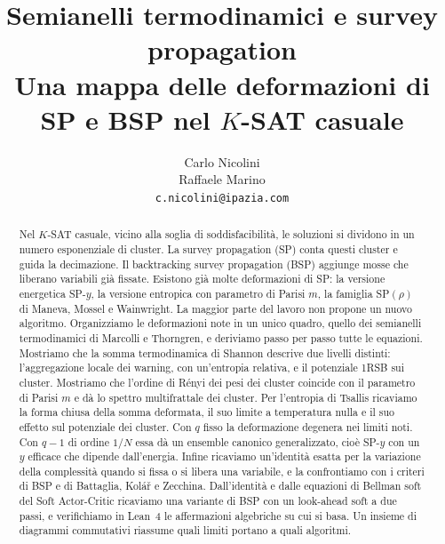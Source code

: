 \documentclass{article}
\title{Semianelli termodinamici e survey propagation\\
\large Una mappa delle deformazioni di SP e BSP nel $K$-SAT casuale}
\author{Carlo Nicolini\\
Raffaele Marino\\
\texttt{c.nicolini@ipazia.com}}
\theoremstyle{definition}
\theoremstyle{remark}
\begin{document}
\maketitle

\begin{abstract}
Nel $K$-SAT casuale, vicino alla soglia di soddisfacibilità, le soluzioni si dividono in un numero esponenziale di cluster.
La survey propagation (SP) conta questi cluster e guida la decimazione.
Il backtracking survey propagation (BSP) aggiunge mosse che liberano variabili già fissate.
Esistono già molte deformazioni di SP: la versione energetica SP-$y$, la versione entropica con parametro di Parisi $m$, la famiglia SP$(\rho)$ di Maneva, Mossel e Wainwright.
La maggior parte del lavoro non propone un nuovo algoritmo.
Organizziamo le deformazioni note in un unico quadro, quello dei semianelli termodinamici di Marcolli e Thorngren, e deriviamo passo per passo tutte le equazioni.
Mostriamo che la somma termodinamica di Shannon descrive due livelli distinti: l'aggregazione locale dei warning, con un'entropia relativa, e il potenziale 1RSB sui cluster.
Mostriamo che l'ordine di Rényi dei pesi dei cluster coincide con il parametro di Parisi $m$ e dà lo spettro multifrattale dei cluster.
Per l'entropia di Tsallis ricaviamo la forma chiusa della somma deformata, il suo limite a temperatura nulla e il suo effetto sul potenziale dei cluster.
Con $q$ fisso la deformazione degenera nei limiti noti.
Con $q-1$ di ordine $1/N$ essa dà un ensemble canonico generalizzato, cioè SP-$y$ con un $y$ efficace che dipende dall'energia.
Infine ricaviamo un'identità esatta per la variazione della complessità quando si fissa o si libera una variabile, e la confrontiamo con i criteri di BSP e di Battaglia, Kolář e Zecchina.
Dall'identità e dalle equazioni di Bellman soft del Soft Actor-Critic ricaviamo una variante di BSP con un look-ahead soft a due passi, e verifichiamo in Lean~4 le affermazioni algebriche su cui si basa.
Un insieme di diagrammi commutativi riassume quali limiti portano a quali algoritmi.
\end{abstract}












\appendix




\end{document}
